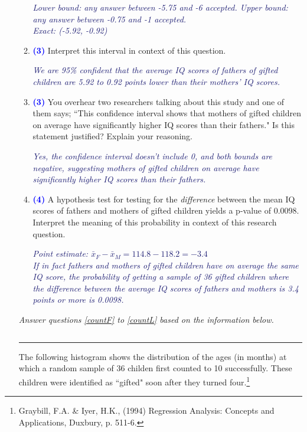 \documentclass[11pt]{article}
\newcommand{\soln}[1]{\textcolor{MidnightBlue}{\textit{#1}}}	%
\newcommand{\pts}[1]{ \textbf{{\footnotesize \textcolor{blue}{(#1)}}} }	%
\begin{document}
\begin{enumerate}
\begin{enumerate}
\soln{Lower bound: any answer between -5.75 and -6 accepted. Upper bound: any answer between -0.75 and -1 accepted.\\
Exact: (-5.92, -0.92)}

\item \pts{3} Interpret this interval in context of this question. 

\soln{We are 95\% confident that the average IQ scores of fathers of gifted children are 5.92 to 0.92 points lower than their mothers' IQ scores.}

\vfill
\pagebreak

%

\item \pts{3} You overhear two researchers talking about this study and one of them says; ``This confidence interval shows that mothers of gifted children on average have significantly higher IQ scores than their fathers." Is this statement justified? Explain your reasoning.

\soln{Yes, the confidence interval doesn't include 0, and both bounds are negative, suggesting mothers of gifted children on average have significantly higher IQ scores than their fathers.}
$\:$\\
$\:$\\

\item \pts{4} A hypothesis test for testing for the \emph{difference} between the mean IQ scores of fathers and mothers of gifted children yields a p-value of 0.0098. Interpret the meaning of this probability in context of this research question.

\soln{Point estimate: $\bar{x}_F - \bar{x}_M = 114.8 - 118.2 = -3.4$\\
$\:$ \\
If in fact fathers and mothers of gifted children have on average the same IQ score, the probability of getting a sample of 36 gifted children where the difference between the average IQ scores of fathers and mothers is 3.4 points or more is 0.0098.}

\end{enumerate}
%

\pagebreak

\begin{center}
\textit{Answer questions \ref{countF} to \ref{countL} based on the information below.}
\end{center}
$\:$
\hrule
The following histogram shows the distribution of the ages (in months) at which a random sample of 36 childen first counted to 10 successfully. These children were identified as ``gifted" soon after they turned four.\footnote{Graybill, F.A. \& Iyer, H.K., (1994) Regression Analysis: Concepts and Applications, Duxbury, p. 511-6.}


\end{enumerate}
\end{document}
